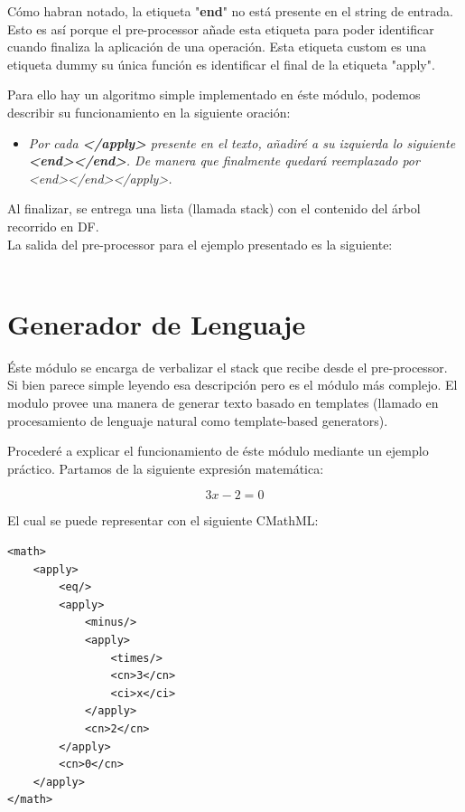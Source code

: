 Cómo habran notado, la etiqueta "\textbf{end}" no está presente en el string de entrada. Esto es así porque el pre-processor añade esta etiqueta para poder identificar cuando finaliza la aplicación de una operación. 
Esta etiqueta custom es una etiqueta dummy su única función es identificar el final de la etiqueta "apply".

Para ello hay un algoritmo simple implementado en éste módulo, podemos describir su funcionamiento en la siguiente oración:

\begin{itemize}
\item \textit{Por cada \textbf{</apply>} presente en el texto, añadiré a su izquierda lo siguiente \textbf{<end></end>}. De manera que finalmente quedará reemplazado por <end></end></apply>.}
\end{itemize}

Al finalizar, se entrega una lista (llamada stack) con el contenido del árbol recorrido en DF.\\[0.01cm]

La salida del pre-processor para el ejemplo presentado es la siguiente:\\[0.01cm]

\\[0.01cm]


\section{Generador de Lenguaje}

Éste módulo se encarga de verbalizar el stack que recibe desde el pre-processor. Si bien parece simple leyendo esa descripción pero es el módulo más complejo. El modulo provee una manera de generar texto basado en templates (llamado en procesamiento de lenguaje natural como template-based generators).

Procederé a explicar el funcionamiento de éste módulo mediante un ejemplo práctico. Partamos de la siguiente expresión matemática:

$$3x - 2 = 0$$

El cual se puede representar con el siguiente CMathML:

\lstset{language=XML}
\begin{lstlisting}
<math>
    <apply>
        <eq/>
        <apply>
            <minus/>
            <apply>
                <times/>
                <cn>3</cn>
                <ci>x</ci>
            </apply>
            <cn>2</cn>
        </apply>
        <cn>0</cn>
    </apply>
</math>
\end{lstlisting}

